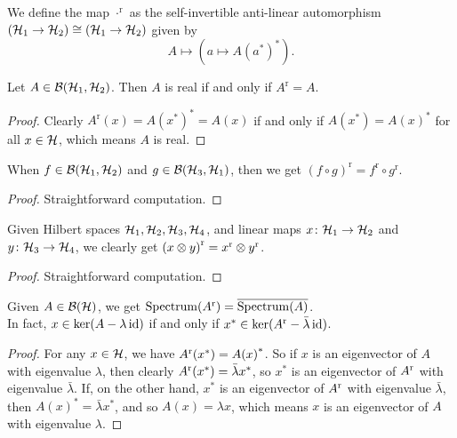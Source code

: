  \begin{definition}\label{LinearMap.real}\leanok
  We define the map $\cdot^{\operatorname{r}}$ as the self-invertible anti-linear automorphism $(\mathcal{H}_1\to\mathcal{H}_2)\cong(\mathcal{H}_1\to\mathcal{H}_2)$ given by
  \[A\mapsto(a\mapsto{A(a^*)}^*).\]
 \end{definition}

 \begin{lemma}\label{LinearMap.isReal_iff}\leanok
  Let $A\in\mathcal{B}(\mathcal{H}_1,\mathcal{H}_2)$. Then $A$ is real if and only if $A^{\operatorname{r}}=A$.
 \end{lemma}
 \begin{proof}\leanok
  Clearly $A^{\operatorname{r}}(x)={A(x^*)}^*=A(x)$ if and only if $A(x^*)={A(x)}^*$ for all $x\in\mathcal{H}$, which means $A$ is real.
 \end{proof}

 \begin{lemma}\label{LinearMap.real_comp}\leanok
  When $f\in\mathcal{B}(\mathcal{H}_1,\mathcal{H}_2)$ and $g\in\mathcal{B}(\mathcal{H}_3,\mathcal{H}_1)$, then we get ${(f\circ g)}^{\operatorname{r}}={f^{\operatorname{r}}}\circ{{g^{\operatorname{r}}}}$.
 \end{lemma}
 \begin{proof}\leanok
  Straightforward computation.
 \end{proof}

 \begin{lemma}\label{TensorProduct.map_real}\leanok
  Given Hilbert spaces $\mathcal{H}_1,\mathcal{H}_2,\mathcal{H}_3,\mathcal{H}_4$, and linear maps $x\colon\mathcal{H}_1\to\mathcal{H}_2$ and $y\colon\mathcal{H}_3\to\mathcal{H}_4$, we clearly get ${(x\otimes y)}^{\operatorname{r}}={x}^{\operatorname{r}}\otimes{y}^{\operatorname{r}}$.
 \end{lemma}
 \begin{proof}\leanok
  Straightforward computation.
 \end{proof}

 \begin{proposition}\label{LinearMap.real.spectrum}
  \leanok
  Given $A\in\mathcal{B}(\mathcal{H})$, we get $\operatorname{Spectrum}({A}^{\operatorname{r}})=\overline{\operatorname{Spectrum}(A)}$.\\
  In fact, $x\in\ker(A-\lambda\operatorname{id})$ if and only if $x^*\in\ker({A}^{\operatorname{r}}-\bar{\lambda}\operatorname{id})$.
 \end{proposition}
 \begin{proof}\leanok
  For any $x\in\mathcal{H}$, we have ${A}^{\operatorname{r}}(x^*)={A(x)}^*$. So if $x$ is an eigenvector of $A$ with eigenvalue $\lambda$, then clearly ${A}^{\operatorname{r}}(x^*)=\bar{\lambda}x^*$, so $x^*$ is an eigenvector of ${A}^{\operatorname{r}}$ with eigenvalue $\bar{\lambda}$.
  If, on the other hand, $x^*$ is an eigenvector of ${A}^{\operatorname{r}}$ with eigenvalue $\bar{\lambda}$, then ${A(x)}^*=\bar{\lambda}x^*$, and so $A(x)=\lambda x$, which means $x$ is an eigenvector of $A$ with eigenvalue $\lambda$.
 \end{proof}

